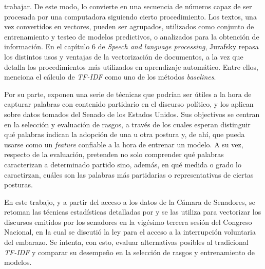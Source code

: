 trabajar.
De este modo, lo convierte en una secuencia de números capaz de ser
procesada por una computadora siguiendo cierto procedimiento.
Los textos, una vez convertidos en vectores, pueden ser agrupados, utilizados
como conjunto de entrenamiento y testeo de modelos predictivos, o analizados para
la obtención de información.
En el capítulo 6 de \textit{Speech and language processing}, Jurafsky
repasa los distintos usos y ventajas de la vectorización de documentos, a la vez
que detalla los procedimientos más utilizados en aprendizaje automático. Entre ellos,
menciona el cálculo de \textit{TF-IDF} como uno de los métodos \textit{baselines}.
\par
Por su parte, \cite{monroe2008fightin} exponen una serie de técnicas
que podrían ser útiles a la hora de capturar palabras con contenido partidario
en el discurso político, y los aplican sobre datos tomados del Senado de los Estados
Unidos. Sus objectivos se centran en la selección y evaluación de rasgos, a través
de los cuales esperan distinguir qué palabras indican la adopción de una u otra postura
y, de ahí, que pueda usarse como un \textit{feature} confiable a la hora de entrenar un
modelo. A su vez, respecto de la evaluación, pretenden no solo comprender qué
palabras caracterizan a determinado partido sino, además, en qué medida o grado
lo caractirzan, cuáles son las palabras más partidarias o representativas de ciertas
posturas.
\par
En este trabajo, y a partir del acceso a los datos de la Cámara de Senadores,
se retoman las técnicas estadísticas detalladas por
\citeauthor{monroe2008fightin} y se las utiliza para vectorizar los
discursos emitidos por los senadores en la vigésimo tercera sesión
del Congreso Nacional, en la cual se discutió la ley para el acceso a
la interrupción voluntaria del embarazo.
Se intenta, con esto, evaluar alternativas posibles al tradicional \textit{TF-IDF}
y comparar su desempeño en la selección de rasgos y entrenamiento de modelos.

